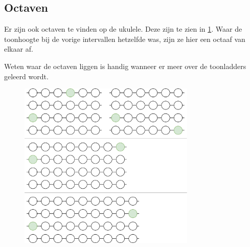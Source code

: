 \newpage

\subsection{Octaven}

Er zijn ook octaven te vinden op de ukulele. Deze zijn te zien in \ref{fig:ukulele_octave_intervals}. Waar de toonhoogte bij de vorige intervallen hetzelfde was, zijn ze hier een octaaf van elkaar af.

Weten waar de octaven liggen is handig wanneer er meer over de toonladders geleerd wordt.

\begin{figure}[h]
    \centering
    \includegraphics[width=0.75\textwidth]{../Images/ukulele-fretboard-octaves.png}
    \label{fig:ukulele_octave_intervals}
\end{figure}

